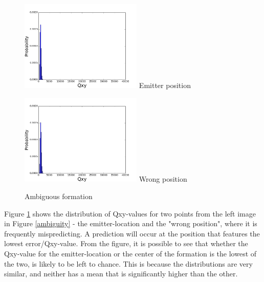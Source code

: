 \documentclass[10pt,a4paper]{book}
\begin{document}
\begin{figure}[H]
\centering
\begin{minipage}{55mm}
  \centering
  \includegraphics[width=58mm]{Ambiguous_-_Emitter_position.png}
  Emitter position
\end{minipage}%
\begin{minipage}{55mm}
  \centering
  \includegraphics[width=58mm]{Ambiguous_-_Wrong_position.png}
  Wrong position
\end{minipage}
\caption{Ambiguous formation}
\label{ambiguousform}
\end{figure}

Figure \ref{ambiguousform} shows the distribution of Qxy-values for two points from the left image in Figure \ref{ambiguity} - the emitter-location and the "wrong position", where it is frequently mispredicting. A prediction will occur at the position that features the lowest error/Qxy-value. From the figure, it is possible to see that whether the Qxy-value for the emitter-location or the center of the formation is the lowest of the two, is likely to be left to chance. This is because the distributions are very similar, and neither has a mean that is significantly higher than the other. 
\end{document}
